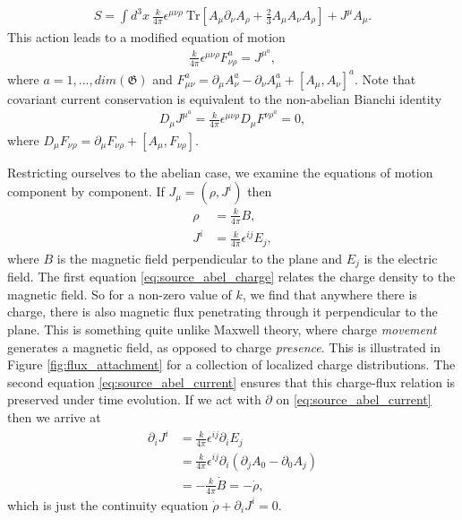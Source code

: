     \begin{align}
        S = \int d^3x \ \frac{k}{4 \pi} \epsilon^{\mu \nu \rho} \ \mathrm{Tr} \left[A_{\mu} \partial_{\nu} A_{\rho}+ \frac{2}{3} A_{\mu} A_{\nu} A_{\rho} \right] + J^{\mu} A_{\mu}.
    \end{align}
    This action leads to a modified equation of motion
    \begin{align}
        \frac{k}{4 \pi} \epsilon^{\mu \nu \rho} F^a_{\nu \rho} = J^{\mu}^a,
    \end{align}
    where $a=1,...,dim(\mathfrak{G})$ and $F_{\mu \nu}^a = \partial_{\mu} A_{\nu}^a - \partial_{\nu} A_{\mu}^a + [A_{\mu}, A_{\nu}]^a$. Note that covariant current conservation is equivalent to the non-abelian Bianchi identity
    \begin{align}
        D_{\mu} J^{\mu}^a = \frac{k}{4 \pi} \epsilon^{\mu \nu \rho} D_{\mu} F^{\nu \rho}^a = 0,
    \end{align}
    where $D_{\mu} F_{\nu \rho} = \partial_{\mu} F_{\nu \rho} + [A_{\mu}, F_{\nu \rho}]$.

    Restricting ourselves to the abelian case, we examine the equations of motion component by component. If $J_{\mu} = (\rho, J^i)$ then
    \begin{align}
        \rho  &= \frac{k}{4 \pi} B \label{eq:source_abel_charge} ,\\
        J^i &= \frac{k}{4 \pi} \epsilon^{i j } E_j \label{eq:source_abel_current},
    \end{align}
    where $B$ is the magnetic field perpendicular to the plane and $E_j$ is the electric field. The first equation \eqref{eq:source_abel_charge} relates the charge density to the magnetic field. So for a non-zero value of $k$, we find that anywhere there is charge, there is also magnetic flux penetrating through it perpendicular to the plane. This is something quite unlike Maxwell theory, where charge \textit{movement} generates a magnetic field, as opposed to charge \textit{presence}. This is illustrated in  Figure \ref{fig:flux_attachment} for a collection of localized charge distributions. The second equation \eqref{eq:source_abel_current} ensures that this charge-flux relation is preserved under time evolution. If we act with $\partial$ on \eqref{eq:source_abel_current} then we arrive at
    \begin{align}
        \partial_i J^i &= \frac{k}{4 \pi} \epsilon^{ij} \partial_i E_j\nonumber \\
        &= \frac{k}{4 \pi} \epsilon^{ij} \partial_i ( \partial_j A_0 - \partial_0 A_j) \nonumber \\
        &= -\frac{k}{4 \pi} \dot{B} = -\dot{\rho},
    \end{align}
    which is just the continuity equation $\dot{\rho} + \partial_i J^i=0$.





